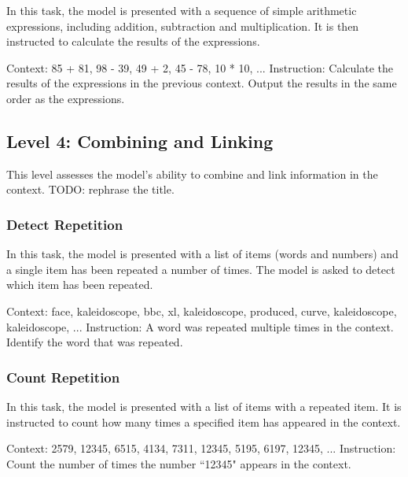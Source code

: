 In this task, the model is presented with a sequence of simple arithmetic expressions, including addition, subtraction and multiplication. It is then instructed to calculate the results of the expressions.

\begin{tcolorbox}[colback=red!5!white,colframe=red!75!black,title=Example prompt]
Context: 85 + 81, 98 - 39, 49 + 2, 45 - 78, 10 * 10, ...
\tcblower
Instruction: Calculate the results of the expressions in the previous context. Output the results in the same order as the expressions.
\end{tcolorbox}


\subsection{Level 4: Combining and Linking}
This level assesses the model's ability to combine and link information in the context. TODO: rephrase the title.

\subsubsection{Detect Repetition}
In this task, the model is presented with a list of items (words and numbers) and a single item has been repeated a number of times. The model is asked to detect which item has been repeated.

\begin{tcolorbox}[colback=red!5!white,colframe=red!75!black,title=Example prompt]
Context: face, kaleidoscope, bbc, xl, kaleidoscope, produced, curve, kaleidoscope, kaleidoscope, ...
\tcblower
Instruction: A word was repeated multiple times in the context. Identify the word that was repeated.
\end{tcolorbox}

\subsubsection{Count Repetition}

In this task, the model is presented with a list of items with a repeated item. It is instructed to count how many times a specified item has appeared in the context.

\begin{tcolorbox}[colback=red!5!white,colframe=red!75!black,title=Example prompt]
Context: 2579, 12345, 6515, 4134, 7311, 12345, 5195, 6197, 12345, ...
\tcblower
Instruction: Count the number of times the number ``12345" appears in the context.
\end{tcolorbox}

